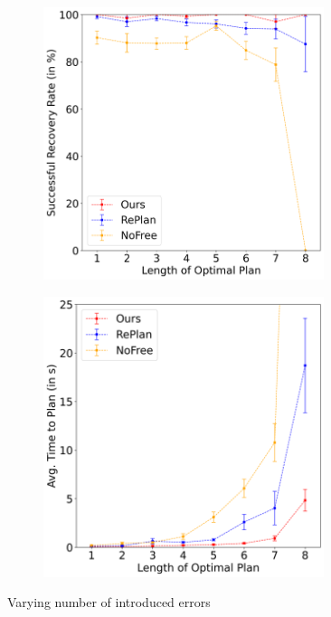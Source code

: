 \begin{figure}
    \begin{subfigure}{0.5\hsize}
       \centering    \includegraphics[width=0.9\textwidth]{assets/vary-errors-1.png}
    \end{subfigure}
    \begin{subfigure}{0.5\hsize}
       \centering    \includegraphics[width=0.9\textwidth]{assets/vary-errors-2.png}
    \end{subfigure}
    \caption{
        Varying number of introduced errors
    }
    \label{fig:graphs-errors}
\end{figure}

